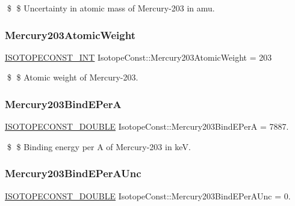 \$ \$ Uncertainty in atomic mass of Mercury-\/203 in amu. \mbox{\label{group___isotope_const-_mercury-_hg203_ga05fdedfea4a21eecf58c2a50eaaf6271}} 
\subsubsection{\texorpdfstring{Mercury203\+Atomic\+Weight}{Mercury203AtomicWeight}}
{\footnotesize\ttfamily \mbox{\hyperlink{group___isotope_const-_macros_ga5f18360b3e99483a35c32d789e62621c}{I\+S\+O\+T\+O\+P\+E\+C\+O\+N\+S\+T\+\_\+\+I\+NT}} Isotope\+Const\+::\+Mercury203\+Atomic\+Weight = 203}

\$ \$ Atomic weight of Mercury-\/203. \mbox{\label{group___isotope_const-_mercury-_hg203_ga49405ed0317b006a509cb71d67ed3252}} 
\subsubsection{\texorpdfstring{Mercury203\+Bind\+E\+PerA}{Mercury203BindEPerA}}
{\footnotesize\ttfamily \mbox{\hyperlink{group___isotope_const-_macros_ga8f45a7272ce02c0b4c65c44636ed719a}{I\+S\+O\+T\+O\+P\+E\+C\+O\+N\+S\+T\+\_\+\+D\+O\+U\+B\+LE}} Isotope\+Const\+::\+Mercury203\+Bind\+E\+PerA = 7887.}

\$ \$ Binding energy per A of Mercury-\/203 in keV. \mbox{\label{group___isotope_const-_mercury-_hg203_ga31c80afb558cdf7d283d8d63e804652a}} 
\subsubsection{\texorpdfstring{Mercury203\+Bind\+E\+Per\+A\+Unc}{Mercury203BindEPerAUnc}}
{\footnotesize\ttfamily \mbox{\hyperlink{group___isotope_const-_macros_ga8f45a7272ce02c0b4c65c44636ed719a}{I\+S\+O\+T\+O\+P\+E\+C\+O\+N\+S\+T\+\_\+\+D\+O\+U\+B\+LE}} Isotope\+Const\+::\+Mercury203\+Bind\+E\+Per\+A\+Unc = 0.}

